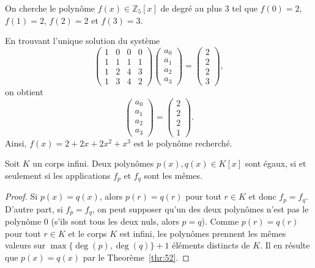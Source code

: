 \begin{example}
  \label{exe:38}
  On cherche le polynôme $f(x) ∈ ℤ_5[x]$ de degré au plus $3$ tel que
  $f(0) = 2$, $f(1)=2$, $f(2) = 2$ et $f(3) = 3$.

  En trouvant l'unique solution du système
  \begin{displaymath}
    \left(\begin{array}{rrrr}
1 & 0 & 0 & 0 \\
1 & 1 & 1 & 1 \\
1 & 2 & 4 & 3 \\
1 & 3 & 4 & 2
\end{array}\right)
\begin{pmatrix}
  a_0 \\ a_1 \\ a_2 \\ a_3
\end{pmatrix}
=
\begin{pmatrix}
  2 \\ 2 \\ 2 \\3
\end{pmatrix},
\end{displaymath}on obtient
\begin{displaymath}
  \begin{pmatrix}
  a_0 \\ a_1 \\ a_2 \\ a_3
\end{pmatrix} =
\begin{pmatrix}
  2 \\ 2 \\ 2 \\ 1
\end{pmatrix}.
\end{displaymath}
Ainsi, $f(x) = 2 + 2x + 2x^2 + x^3$ est le polynôme recherché. 

\end{example}


\begin{corollary}
  \label{thr:42}
  Soit $K$ un corps infini. Deux polynômes $p(x),q(x) ∈ K[x]$ sont égaux, si et seulement si les applications $f_p$ et $f_q$ sont les mêmes.
\end{corollary}
\begin{proof}
  Si $p(x) = q(x)$, alors $p(r) = q(r)$ pour tout $r ∈K$ et donc $f_p = f_q$. D'autre part, si $f_p = f_q$, on peut supposer qu'un des deux polynômes n'est pas le polynôme $0$ (s'ils sont tous les deux nuls, alors $p=q$).  Comme $p(r) = q(r)$ pour tout $r ∈K$ et le corps $K$ est infini, les polynômes prennent les mêmes valeurs sur $\max\{\deg(p),\deg(q)\}+1$ éléments distincts de $K$. Il en résulte que $p(x) = q(x)$ par le Theorème~\ref{thr:52}. 
\end{proof}


